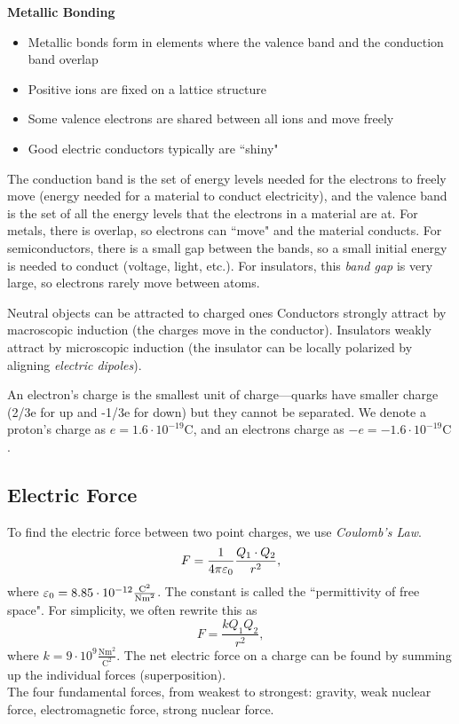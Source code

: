 \documentclass[class=article, crop=false]{standalone}
\begin{document}
  \textbf{Metallic Bonding}
  \begin{itemize}
    \item Metallic bonds form in elements where the valence band and the conduction band overlap
    \item Positive ions are fixed on a lattice structure
    \item Some valence electrons are shared between all ions and move freely
    \item Good electric conductors typically are ``shiny"
  \end{itemize}
  The conduction band is the set of energy levels needed for the electrons to freely move (energy needed for a material to conduct electricity), and the valence band is the set of all the energy levels that the electrons in a material are at. For metals, there is overlap, so electrons can ``move" and the material conducts. For semiconductors, there is a small gap between the bands, so a small initial energy is needed to conduct (voltage, light, etc.). For insulators, this \emph{band gap} is very large, so electrons rarely move between atoms.
  \begin{note}{Neutral objects can be attracted to charged ones}
    Conductors strongly attract by macroscopic induction (the charges move in the conductor). Insulators weakly attract by microscopic induction (the insulator can be locally polarized by aligning \emph{electric dipoles}).
  \end{note}
  An electron's charge is the smallest unit of charge---quarks have smaller charge (2/3e for up and -1/3e for down) but they cannot be separated. We denote a proton's charge as $e = 1.6\cdot 10^{-19} \mathrm{C}$, and an electrons charge as $-e = -1.6\cdot 10^{-19} \mathrm{C}$. 
  \subsection{Electric Force}
  To find the electric force between two point charges, we use \emph{Coulomb's Law}.
  \[
    F = \frac{1}{4\pi\varepsilon_0}\frac{Q_1\cdot Q_2}{r^2},
  \]
  where $\varepsilon_0 = 8.85\cdot 10^{-12}\frac{\mathrm{C}^2}{\mathrm{Nm}^2}$. The constant is called the ``permittivity of free space". For simplicity, we often rewrite this as 
  \[
    F = \frac{kQ_1Q_2}{r^2},
  \]
  where $k = 9\cdot 10^9 \frac{\mathrm{Nm}^2}{\mathrm{C}^2}$. The net electric force on a charge can be found by summing up the individual forces (superposition). \\[10pt]
  The four fundamental forces, from weakest to strongest: gravity, weak nuclear force, electromagnetic force, strong nuclear force.
\end{document}
